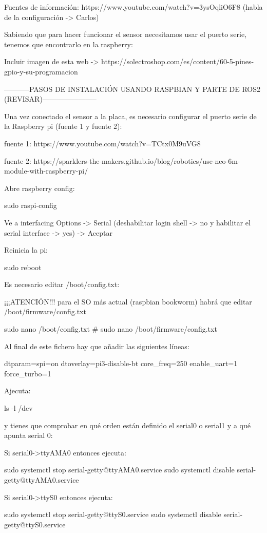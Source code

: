 Fuentes de información: 
https://www.youtube.com/watch?v=3ysOqliO6F8 (habla de la configuración -> Carlos)


Sabiendo que para hacer funcionar el sensor necesitamos usar el puerto serie, tenemos que encontrarlo en la raspberry:

Incluir imagen de esta web -> https://solectroshop.com/es/content/60-5-pines-gpio-y-su-programacion


-----------PASOS DE INSTALACIÓN USANDO RASPBIAN Y PARTE DE ROS2 (REVISAR)-----------------------

Una vez conectado el sensor a la placa, es necesario configurar el puerto serie de la Raspberry pi (fuente 1 y fuente 2):

fuente 1: https://www.youtube.com/watch?v=TCtx0M9uVG8

fuente 2: https://sparklers-the-makers.github.io/blog/robotics/use-neo-6m-module-with-raspberry-pi/

Abre raspberry config:

sudo raspi-config

Ve a interfacing Options -> Serial (deshabilitar login shell -> no y habilitar el serial interface -> yes) -> Aceptar

Reinicia la pi:

sudo reboot

Es necesario editar /boot/config.txt:

¡¡¡ATENCIÓN!!! para el SO más actual (raspbian bookworm) habrá que editar /boot/firmware/config.txt

sudo nano /boot/config.txt \# sudo nano /boot/firmware/config.txt

Al final de este fichero hay que añadir las siguientes líneas:

dtparam=spi=on
dtoverlay=pi3-disable-bt
core\_freq=250
enable\_uart=1
force\_turbo=1

Ajecuta:

ls -l /dev

y tienes que comprobar en qué orden están definido el serial0 o serial1 y a qué apunta serial 0:

Si serial0->ttyAMA0 entonces ejecuta:

sudo systemctl stop serial-getty@ttyAMA0.service
sudo systemctl disable serial-getty@ttyAMA0.service

Si serial0->ttyS0 entonces ejecuta:

sudo systemctl stop serial-getty@ttyS0.service
sudo systemctl disable serial-getty@ttyS0.service

